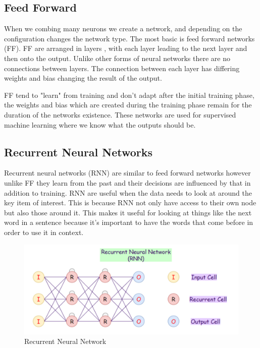 \documentclass[11pt]{article}
\begin{document}
    \subsection{Feed Forward}
    When we combing many neurons we create a network, and depending on the configuration changes the network type. The most basic is feed forward networks (FF). FF are arranged in layers \cite{NeuralArchitecture}, with each layer leading to the next layer and then onto the output. Unlike other forms of neural networks there are no connections between layers. The connection between each layer has differing weights and bias changing the result of the output.
    
    FF tend to "learn" from training and don't adapt after the initial training phase, the weights and bias which are created during the training phase remain for the duration of the networks existence. These networks are used for supervised machine learning where we know what the outputs should be. 
    
    \subsection{Recurrent Neural Networks}
    Recurrent neural networks (RNN) are similar to feed forward networks however unlike FF they learn from the past \cite{RecurrentScience} and their decisions are influenced by that in addition to training. RNN are useful when the data needs to look at around the key item of interest. This is because RNN not only have access to their own node but also those around it. This makes it useful for looking at things like the next word in a sentence because it's important to have the words that come before in order to use it in context.
    
        \begin{figure}[h]
        \centering
        \includegraphics[scale=0.75]{RNN.png}
        \caption{Recurrent Neural Network \cite{MainAI}}
        \label{fig:RRN}
    \end{figure}
    
\end{document}
